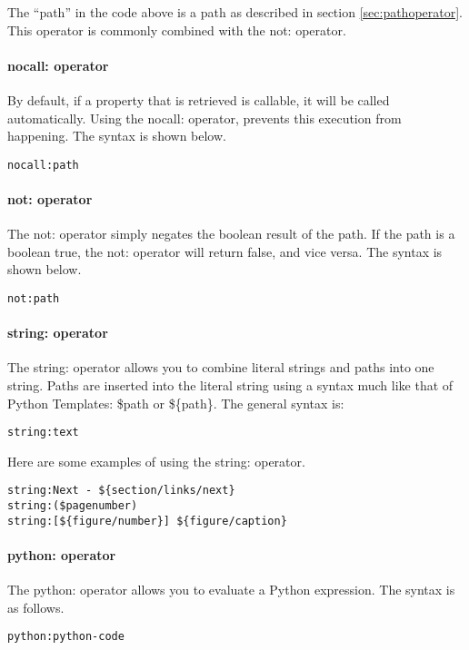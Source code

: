 The ``path'' in the code above is a path as described in section
\ref{sec:pathoperator}.  This operator is commonly combined with the
not: operator.


\paragraph{nocall: operator}

By default, if a property that is retrieved is callable, it will be
called automatically.  Using the nocall: operator, prevents this
execution from happening.  The syntax is shown below.
\begin{verbatim}
nocall:path
\end{verbatim}


\paragraph{not: operator}

The not: operator simply negates the boolean result of the path.  If
the path is a boolean true, the not: operator will return false, and
vice versa.  The syntax is shown below.
\begin{verbatim}
not:path
\end{verbatim}


\paragraph{string: operator}

The string: operator allows you to combine literal strings and paths
into one string.  Paths are inserted into the literal string using a
syntax much like that of Python Templates: \$path or \$\{path\}.
The general syntax is:
\begin{verbatim}
string:text
\end{verbatim}

Here are some examples of using the string: operator.
\begin{verbatim}
string:Next - ${section/links/next}
string:($pagenumber)
string:[${figure/number}] ${figure/caption}
\end{verbatim}


\paragraph{python: operator}

The python: operator allows you to evaluate a Python expression.  The
syntax is as follows.
\begin{verbatim}
python:python-code
\end{verbatim}

